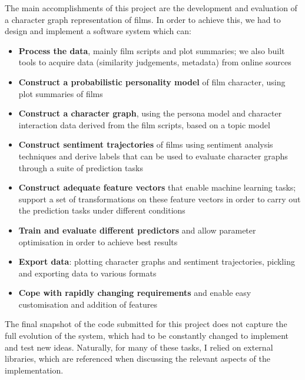 \documentclass[bsc,frontabs,singlespacing,parskip, twoside]{infthesis}
\begin{document}
The main accomplishments of this project are the development and evaluation of a character graph representation of films. In order to achieve this, we had to design and implement a software system which can:
\begin{itemize}
	\item \textbf{Process the data}, mainly film scripts and plot summaries; we also built tools to acquire data (similarity judgements, metadata) from online sources
	\item \textbf{Construct a probabilistic personality model} of film character, using plot summaries of films
	\item \textbf{Construct a character graph}, using the persona model and character interaction data derived from the film scripts, based on a topic model
	\item \textbf{Construct sentiment trajectories} of films using sentiment analysis techniques and derive labels that can be used to evaluate character graphs through a suite of prediction tasks
	\item \textbf{Construct adequate feature vectors} that enable machine learning tasks; support a set of transformations on these feature vectors in order to carry out the prediction tasks under different conditions
	\item \textbf{Train and evaluate different predictors} and allow parameter optimisation in order to achieve best results
	\item \textbf{Export data}: plotting character graphs and sentiment trajectories, pickling and exporting data to various formats
	\item \textbf{Cope with rapidly changing requirements} and enable easy customisation and addition of features
\end{itemize}

The final snapshot of the code submitted for this project does not capture the full evolution of the system, which had to be constantly changed to implement and test new ideas. Naturally, for many of these tasks, I relied on external libraries, which are referenced when discussing the relevant aspects of the implementation.
\end{document}
